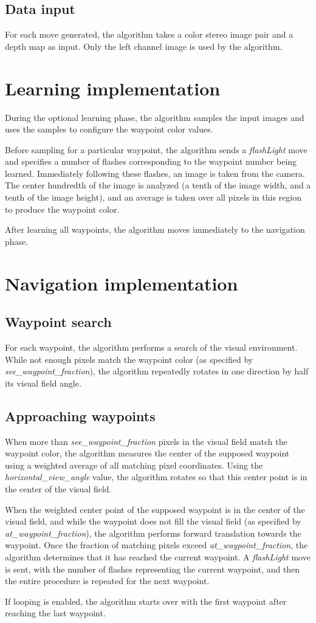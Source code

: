 \documentclass[12pt]{article}
\begin{document}
\subsection{Data input}
For each move generated, the algorithm takes a color stereo image pair and a depth map as input.  Only the left channel image is used by the algorithm.

\section{Learning implementation}
During the optional learning phase, the algorithm samples the input images and uses the samples to configure the waypoint color values.

Before sampling for a particular waypoint, the algorithm sends a {\it flashLight} move and specifies a number of flashes corresponding to the waypoint number being learned.  Immediately following these flashes, an image is taken from the camera.  The center hundredth of the image is analyzed (a tenth of the image width, and a tenth of the image height), and an average is taken over all pixels in this region to produce the waypoint color.

After learning all waypoints, the algorithm moves immediately to the navigation phase.

\section{Navigation implementation}
\subsection{Waypoint search}
For each waypoint, the algorithm performs a search of the visual environment.  While not enough pixels match the waypoint color (as specified by {\it see\_waypoint\_fraction}), the algorithm repeatedly rotates in one direction by half its visual field angle.

\subsection{Approaching waypoints}
When more than {\it see\_waypoint\_fraction} pixels in the visual field match the waypoint color, the algorithm measures the center of the supposed waypoint using a weighted average of all matching pixel coordinates.  Using the {\it horizontal\_view\_angle} value, the algorithm rotates so that this center point is in the center of the visual field.

When the weighted center point of the supposed waypoint is in the center of the visual field, and while the waypoint does not fill the visual field (as specified by {\it at\_waypoint\_fraction}), the algorithm performs forward translation towards the waypoint.  Once the fraction of matching pixels exceed {\it at\_waypoint\_fraction}, the algorithm determines that it has reached the current waypoint.  A {\it flashLight} move is sent, with the number of flashes representing the current waypoint,  and then the entire procedure is repeated for the next waypoint.

If looping is enabled, the algorithm starts over with the first waypoint after reaching the last waypoint.
\end{document}
